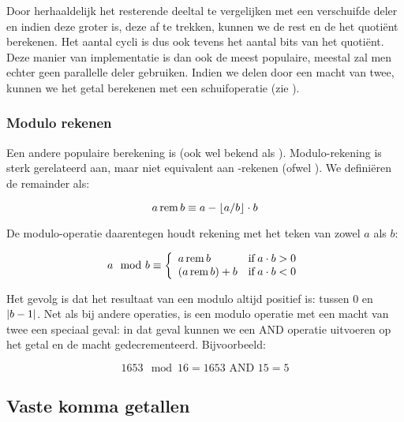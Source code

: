 Door herhaaldelijk het resterende deeltal te vergelijken met een verschuifde deler en indien deze groter is, deze af te trekken, kunnen we de rest en de het quoti\"ent berekenen. Het aantal cycli is dus ook tevens het aantal bits van het quoti\"ent. Deze manier van implementatie is dan ook de meest populaire, meestal zal men echter geen parallelle deler gebruiken. Indien we delen door een macht van twee, kunnen we het getal berekenen met een schuifoperatie (zie ).

\subsubsection{Modulo rekenen}
Een andere populaire berekening is  (ook wel bekend als ). Modulo-rekening is sterk gerelateerd aan, maar niet equivalent aan -rekenen (ofwel ). We defini\"eren de remainder als:

\begin{equation}
a\operatorname{rem} b\equiv a-\left\lfloor a/b \right\rfloor\cdot b
\end{equation}

De modulo-operatie daarentegen houdt rekening met het teken van zowel $a$ als $b$:

\begin{equation}
a\mod b\equiv\left\{\begin{array}{ll} 
a\operatorname{rem} b&\operatorname{if} a\cdot b>0\\
\left( a\operatorname{rem} b \right)+b&\operatorname{if} a\cdot b<0
 \end{array}\right.
\end{equation}

Het gevolg is dat het resultaat van een modulo altijd positief is: tussen $0$ en $\left| b-1 \right|$. Net als bij andere operaties, is een modulo operatie met een macht van twee een speciaal geval: in dat geval kunnen we een AND operatie uitvoeren op het getal en de macht gedecrementeerd. Bijvoorbeeld:

\begin{equation}
1653\mod 16=1653\mbox{ AND }15=5
\end{equation}

\subsection{Vaste komma getallen}

